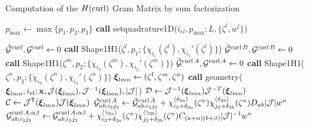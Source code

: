 \begin{algorithm}[ht!]
\caption{Computation of the $H(\operatorname{curl})$ Gram Matrix by sum factorization}\label{algo:hcurltensor}
\begin{algorithmic}
\State $p_{\max}\gets\max\{p_1,p_2,p_3\}$
\State\textbf{call }setquadrature1D($i_{el},p_{\max};L,\{\zeta^l,w^l\}$)

\State $\check{\mathcal{G}}^{\operatorname{curl}},\mathcal{G}^{\operatorname{curl}}\gets 0$
    \State\textbf{call } Shape1H1($\zeta^l,p_1;\{\chi_{i_1}(\zeta^l),\chi_{i_1}'(\zeta^l)\}$) 
            \State $\check{\mathcal{G}}^{\operatorname{curl} B},\mathcal{G}^{\operatorname{curl} B}\gets 0$
                \State\textbf{call } Shape1H1($\zeta^m,p_2;\{\chi_{i_2}(\zeta^m),\chi_{i_2}'(\zeta^m)\}$) 
                \State $\check{\mathcal{G}}^{\operatorname{curl} A},\mathcal{G}^{\operatorname{curl} A}\gets 0$
                    \State\textbf{call } Shape1H1($\zeta^n,p_3;\{\chi_{i_3}(\zeta^n),\chi_{i_3}'(\zeta^n)\}$) 
                    \State $\boldsymbol{\xi}_{lmn}\gets (\zeta^l,\zeta^m,\zeta^n)$
                    \State\textbf{call } geometry( $\boldsymbol{\xi}_{lmn},i_{el};\mathbf{x},\mathcal{J}(\boldsymbol{\xi}_{lmn}),\mathcal{J}^{-1}(\boldsymbol{\xi}_{lmn}),|\mathcal{J}|$)
                    \State $\mathcal{D}\gets\mathcal{J}^{-1}(\boldsymbol{\xi}_{lmn})\mathcal{J}^{-T}(\boldsymbol{\xi}_{lmn})$
                    \State $\mathcal{C}\gets\mathcal{J}^{\mathsf{T}}(\boldsymbol{\xi}_{lmn})\mathcal{J}(\boldsymbol{\xi}_{lmn})$
                            \State$\check{\mathcal{G}}_{ab;i_3j_3}^{\operatorname{curl} A}\gets \check{\mathcal{G}}_{ab;i_3j_3}^{\operatorname{curl} A} + \chi_{i_3+\delta_{3a}}^{\langle\delta_{3a}\rangle}(\zeta^n) \chi_{j_3+\delta_{3b}}^{\langle\delta_{3b}\rangle}(\zeta^n)D_{ab} |\mathcal{J}| w^n$
                                \State$\mathcal{G}_{ab;i_3j_3}^{\operatorname{curl} A;\alpha \beta}\gets \mathcal{G}_{ab;i_3j_3}^{\operatorname{curl} A;\alpha \beta} + \chi_{i_3+\delta_{3a}}^{\langle\gamma_{3a}\rangle}(\zeta^n) \chi_{j_3+\delta_{3b}}^{\langle\gamma_{3b}\rangle}(\zeta^n) C_{(a+\alpha)(b+\beta)} |\mathcal{J}|^{-1} w^n$ \Comment{(\ref{GA_hcurl1})}
                            \EndFor
                        \EndIf

\end{algorithmic}
\end{algorithm}
